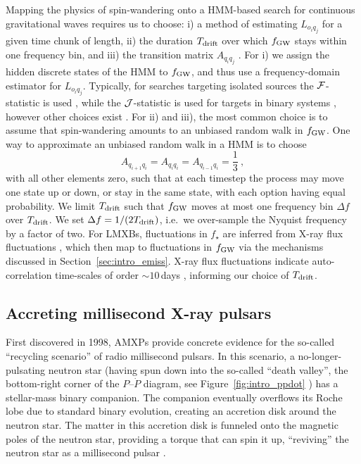 Mapping the physics of spin-wandering onto a HMM-based search for continuous gravitational waves requires us to choose: i) a method of estimating $L_{o_i q_j}$ for a given time chunk of length, ii) the duration $T_{\rm drift}$ over which $f_{\rm GW}$ stays within one frequency bin, and iii) the transition matrix $A_{q_i q_j}$ \citep{Suvorova2016}. For i) we assign the hidden discrete states of the HMM to $f_{\rm GW}$, and thus use a frequency-domain estimator for $L_{o_i q_j}$. Typically, for searches targeting isolated sources the $\mathcal{F}$-statistic is used \citep{Sun2019,Millhouse2020,Beniwal2021,Jones2021,o3aSNR}, while the $\mathcal{J}$-statistic is used for targets in binary systems \citep{o2vitsco,o3amxp,o3vitsco}, however other choices exist \citep{o1vitsco,Bayley2019,Melatos2021}. For ii) and iii), the most common choice is to assume that spin-wandering amounts to an unbiased random walk in $f_{\rm GW}$. One way to approximate an unbiased random walk in a HMM is to choose 
\begin{equation}
    A_{q_{i+1} q_i} = A_{q_{i} q_i} = A_{q_{i-1} q_i} = \frac{1}{3}\ ,\label{eq:aqiqj}
\end{equation}
with all other elements zero, such that at each timestep the process may move one state up or down, or stay in the same state, with each option having equal probability. We limit $T_{\rm drift}$ such that $f_{\rm GW}$ moves at most one frequency bin $\Delta f$ over $T_{\rm drift}$. We set $\Delta f = 1 / (2T_{\rm drift})$, i.e.~we over-sample the Nyquist frequency by a factor of two. For LMXBs, fluctuations in $f_\star$ are inferred from X-ray flux fluctuations \citep{Bildsten1998}, which then map to fluctuations in $f_{\rm GW}$ via the mechanisms discussed in Section~\ref{sec:intro_emiss}. X-ray flux fluctuations indicate auto-correlation time-scales of order $\sim10\,$days \citep{Mukherjee2018}, informing our choice of $T_{\rm drift}$. 

\subsection{Accreting millisecond X-ray pulsars} \label{sec:intro_amxp}
First discovered in 1998, AMXPs provide concrete evidence for the so-called ``recycling scenario'' of radio millisecond pulsars. In this scenario, a no-longer-pulsating neutron star (having spun down into the so-called ``death valley'', the bottom-right corner of the $P$--$\dot{P}$ diagram, see Figure~\ref{fig:intro_ppdot} \citep{Chen1993}) has a stellar-mass binary companion. The companion eventually overflows its Roche lobe due to standard binary evolution, creating an accretion disk around the neutron star. The matter in this accretion disk is funneled onto the magnetic poles of the neutron star, providing a torque that can spin it up, ``reviving'' the neutron star as a millisecond pulsar \citep{Radhakrishnan1982,Alpar1982}. 

